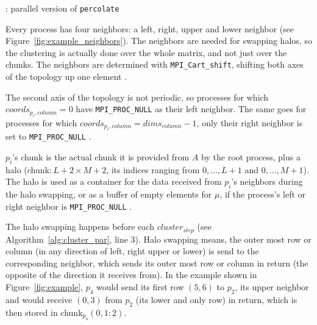 \documentclass[twoside,11pt]{article}
\def\perc{\texttt{perco\-late}}
\begin{document}
\begin{algorithm} %
  \caption{: parallel version of \perc{}}
  \label{alg:perc_par}

  \begin{algorithmic}[1]
    \ENDIF
    \ENDIF

  \end{algorithmic}
\end{algorithm} %

Every process has four neighbors: a left, right, upper and
lower neighbor (see Figure~\ref{fig:example_neighbors}).
The neighbors are needed for swapping halos, so the
clustering is actually done over the whole matrix, and not
just over the chunks.
The neighbors are determined with
\texttt{MPI\_Cart\_shift}, shifting both axes of the
topology up one element \citep[see][Chapter 7]{mpi}.

The second axis of the topology is not periodic, so
processes for which $coords_{p_i, column} = 0$ have
\texttt{MPI\_PROC\_NULL} as their left neighbor.
The same goes for processes for which
$coords_{p_i, column} = dims_{column} - 1$, only their
right neighbor is set to \texttt{MPI\_PROC\_NULL}
\citep[see Figure~\ref{fig:example_neighbors} and]
[Chapter 3]{mpi}.

$p_i$'s chunk is the actual chunk it is provided from $A$
by the root process, plus a halo (chunk$: L+2 \times M+2$,
its indices ranging from $0,\dots,L+1$ and $0,\dots,M+1$).
The halo is used as a container for the data received from
$p_i$'s neighbors during the halo swapping, or as a buffer
of empty elements for $\mu$, if the process's left or right
neighbor is \texttt{MPI\_PROC\_NULL}
\citep[see][Chapter 3]{mpi}.

The halo swapping happens before each $cluster_{step}$
(see Algorithm~\ref{alg:cluster_par}, line 3).
Halo swapping means, the outer most row or column (in
any direction of left, right upper or lower) is send
to the corresponding neighbor, which sends its outer most
row or column in return (the opposite of the direction it
receives from).
In the example shown in Figure~\ref{fig:example}, $p_4$
would send its first row $(5,6)$ to $p_2$, its upper
neighbor and would receive $(0,3)$ from $p_2$ (its lower
and only row) in return, which is then stored in
chunk$_{p_4}(0, 1:2)$.
\end{document}
